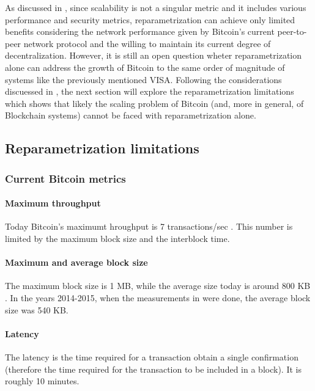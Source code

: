 As discussed in \cite{croman-scaling-blockchain}, since scalability is not a
singular metric and it includes various performance and security metrics,
reparametrization can achieve only limited benefits considering the network
performance given by Bitcoin’s current peer-to-peer network protocol and the
willing to maintain its current degree of decentralization. However, it is still
an open question wheter reparametrization alone can address the growth of
Bitcoin to the same order of magnitude of systems like the previously mentioned
VISA. Following the considerations discuessed in
\cite{croman-scaling-blockchain}, the next section will explore the
reparametrization limitations which shows that likely the scaling problem of
Bitcoin (and, more in general, of Blockchain systems) cannot be faced with
reparametrization alone.

\subsection{Reparametrization limitations}

\subsubsection{Current Bitcoin metrics}
\paragraph{Maximum throughput}  Today Bitcoin’s maximumt hroughput is 7
transactions/sec \cite{wikipedia_scalability_2018}. This number is limited by
the maximum block size and the interblock time.

\paragraph{Maximum and average block size} The maximum block size is 1 MB, while
the average size today is around 800 KB \cite{current-block-size}. In the years
2014-2015, when the measurements in \cite{croman-scaling-blockchain} were done,
the average block size was 540 KB.

\paragraph{Latency} The latency is the time required for a transaction obtain a
single confirmation (therefore the time required for the transaction to be
included in a block). It is roughly 10 minutes.





